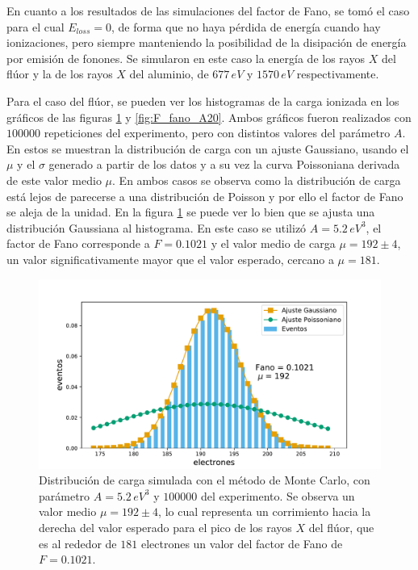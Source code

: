 En cuanto a los resultados de las simulaciones del factor de Fano, se tomó el caso para el cual $E_{loss} = 0$, de forma que no haya pérdida de energía cuando hay ionizaciones, pero siempre manteniendo la posibilidad de la disipación de energía por emisión de fonones. Se simularon en este caso la energía de los rayos $X$ del flúor y la de los rayos $X$ del aluminio, de $677\,\si{eV}$ y $1570\,\si{eV}$ respectivamente.

Para el caso del flúor, se pueden ver los histogramas de la carga ionizada en los gráficos de las figuras \ref{fig:F_fano_A5.2} y \ref{fig:F_fano_A20}. Ambos gráficos fueron realizados con $100000$ repeticiones del experimento, pero con distintos valores del parámetro $A$. En estos se muestran la distribución de carga con un ajuste Gaussiano, usando el $\mu$ y el $\sigma$ generado a partir de los datos y a su vez la curva Poissoniana derivada de este valor medio $\mu$. En ambos casos se observa como la distribución de carga está lejos de parecerse a una distribución de Poisson y por ello el factor de Fano se aleja de la unidad. En la figura \ref{fig:F_fano_A5.2} se puede ver lo bien que se ajusta una distribución Gaussiana al histograma. En este caso se utilizó $A = 5.2\,\si{eV}^{3}$, el factor de Fano corresponde a $F = 0.1021$ y el valor medio de carga $\mu = 192 \pm 4$, un valor significativamente mayor que el valor esperado, cercano a $\mu = 181$.
\begin{figure}%
    \centering
    \includegraphics[scale=0.5]{Figs/F_Fano_E677_A5.2_Eloss0_100ktrials.pdf}
    \caption{\footnotesize{Distribución de carga simulada con el método de Monte Carlo, con parámetro $A = 5.2\,\si{eV}^{3}$ y $100000$ del experimento. Se observa un valor medio $\mu = 192 \pm 4$, lo cual representa un corrimiento hacia la derecha del valor esperado para el pico de los rayos $X$ del flúor, que es al rededor de $181$ electrones un valor del factor de Fano de $F = 0.1021$.}}
    \label{fig:F_fano_A5.2}
\end{figure}
